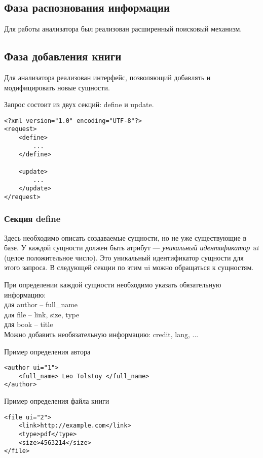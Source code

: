 \subsection{Фаза распознования информации}

Для работы анализатора был реализован расширенный поисковый механизм.


\subsection{Фаза добавления книги}


Для анализатора реализован интерфейс, позволяющий добавлять и модифицировать новые сущности.

Запрос состоит из двух секций: define и update. 

\begin{verbatim}
<?xml version="1.0" encoding="UTF-8"?>
<request>
    <define>
        ...
    </define>

    <update>
        ...
    </update>
</request>
\end{verbatim}


\subsubsection{Секция define}

Здесь необходимо описать создаваемые сущности, но не уже существующие в базе. У каждой сущности должен быть атрибут --- {\em уникальный идентификатор ui} (целое положительное число). Это уникальный идентификатор сущности для этого запроса. В следующей секции по этим ui можно обращаться к сущностям. 

При определении каждой сущности необходимо указать обязательную информацию: \\
для author -- full\_name \\
для file -- link, size, type\\
для book -- title \\


Можно добавить необязательную информацию: credit, lang, ... 

Пример определения автора 
\begin{verbatim}
<author ui="1">
    <full_name> Leo Tolstoy </full_name>
</author>
\end{verbatim}

Пример определения файла книги 
\begin{verbatim}
<file ui="2">
    <link>http://example.com</link>
    <type>pdf</type>
    <size>4563214</size>
</file>
\end{verbatim}


